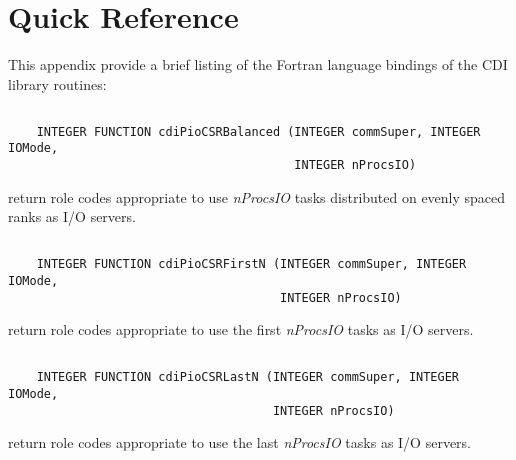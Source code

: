 \chapter*{Quick Reference}

This appendix provide a brief listing of the Fortran language bindings of the
CDI library routines:

\section*{\tt {}}

\begin{verbatim}
    INTEGER FUNCTION cdiPioCSRBalanced (INTEGER commSuper, INTEGER IOMode,
                                        INTEGER nProcsIO)
\end{verbatim}

return role codes appropriate to use \textit{nProcsIO}
tasks distributed on evenly spaced ranks as I/O servers.


\section*{\tt {}}

\begin{verbatim}
    INTEGER FUNCTION cdiPioCSRFirstN (INTEGER commSuper, INTEGER IOMode,
                                      INTEGER nProcsIO)
\end{verbatim}

return role codes appropriate to use the first
\textit{nProcsIO} tasks as I/O servers.


\section*{\tt {}}

\begin{verbatim}
    INTEGER FUNCTION cdiPioCSRLastN (INTEGER commSuper, INTEGER IOMode,
                                     INTEGER nProcsIO)
\end{verbatim}

return role codes appropriate to use the last
\textit{nProcsIO} tasks as I/O servers.


\section*{\tt {}}

